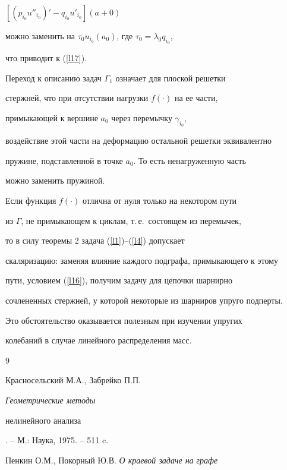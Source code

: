 {{{{{{{\begin{pf}
$[(p_{i_0}u''_{i_0})'-q_{i_0}u'_{i_0}](a+0)$


можно заменить на $\tau_0 u_{i_0}(a_0)$, где $\tau_0=\lambda_0 q_{i_0}$,


что приводит к (\ref{l17}).


\end{pf}





Переход к описанию задач $\Gamma_1$ означает для плоской решетки


стержней, что при отсутствии нагрузки $f(\cdot)$ на ее части,


примыкающей к вершине $a_0$ через перемычку $\gamma_{i_0}$,


воздействие этой части на деформацию остальной решетки эквивалентно


пружине, подставленной в точке $a_0$. То есть ненагруженную часть


можно заменить пружиной.





Если функция $f(\cdot)$ отлична от нуля только на некотором пути


из $\Gamma$, не примыкающем к циклам, т.\,е.~состоящем из перемычек,


то в силу теоремы 2 задача (\ref{l1})--(\ref{l4}) допускает


скаляризацию: заменяя влияние каждого подграфа, примыкающего к этому


пути, условием (\ref{l16}), получим задачу для цепочки шарнирно


сочлененных стержней, у которой некоторые из шарниров упруго подперты.


Это обстоятельство оказывается полезным при изучении упругих


колебаний в случае линейного распределения масс.








\begin{thebibliography}{9}




Красносельский М.А., Забрейко П.П. {\em Геометрические методы


нелинейного анализа}. -- М.: Наука, 1975. -- 511 c.




Пенкин О.М., Покорный Ю.В. {\em О краевой задаче на графе}



\end{thebibliography}}}}}}}}
